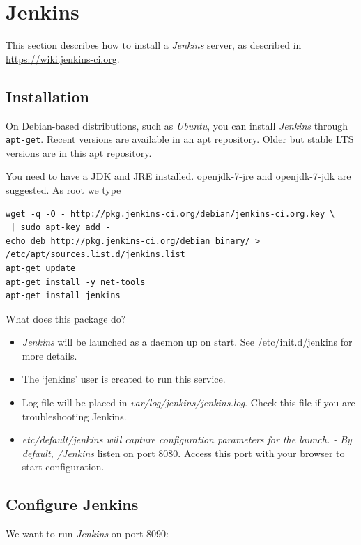 \documentclass[11pt]{article}
\begin{document}
\section{Jenkins}
\label{sec-5}

This section describes how to install a \emph{Jenkins} server, as described in \href{https://wiki.jenkins-ci.org/display/JENKINS/Installing%2BJenkins%2Bon%2BUbuntu}{https://wiki.jenkins-ci.org}. 
\subsection{Installation}
\label{sec-5-1}

On Debian-based distributions, such as \emph{Ubuntu}, you can install \emph{Jenkins} through \texttt{apt-get}. Recent versions are available in an apt repository. Older but stable LTS versions are in this apt repository.

You need to have a JDK and JRE installed. openjdk-7-jre and openjdk-7-jdk are suggested. As root we type

\begin{verbatim}
wget -q -O - http://pkg.jenkins-ci.org/debian/jenkins-ci.org.key \
 | sudo apt-key add - 
echo deb http://pkg.jenkins-ci.org/debian binary/ >  /etc/apt/sources.list.d/jenkins.list
apt-get update
apt-get install -y net-tools
apt-get install jenkins
\end{verbatim}

What does this package do?

\begin{itemize}
\item \emph{Jenkins} will be launched as a daemon up on start. See /etc/init.d/jenkins for more details.
\item The `jenkins' user is created to run this service.
\item Log file will be placed in \emph{var/log/jenkins/jenkins.log}. Check this file if you are troubleshooting Jenkins.
\item \emph{etc/default/jenkins will capture configuration parameters for the launch. - By default, /Jenkins} listen on port 8080. Access this port with your browser to start configuration.
\end{itemize}
\subsection{Configure Jenkins}
\label{sec-5-2}

We want to run \emph{Jenkins} on port 8090: 
\end{document}
